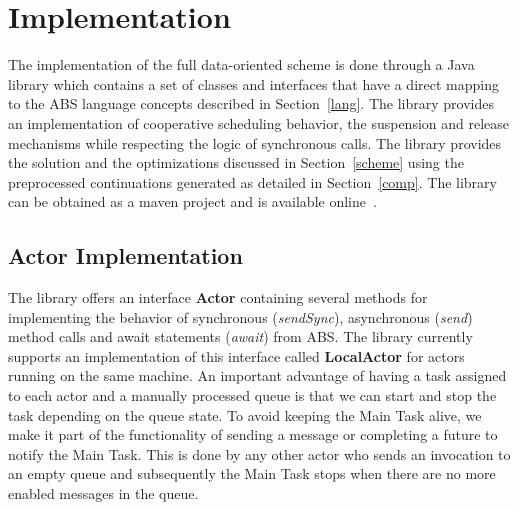 \section{Implementation}
\label{run}
The implementation of the full data-oriented scheme is done through a Java library which contains a set of classes and interfaces that have a direct mapping to the ABS language concepts described in Section~\ref{lang}. The library provides an implementation of cooperative scheduling behavior, the suspension and release mechanisms while respecting the logic of synchronous calls. The library provides the solution and the optimizations discussed in Section~\ref{scheme} using the preprocessed continuations generated as detailed in Section~\ref{comp}. The library can be obtained as a maven project and is available online~\cite{library}.





\subsection{Actor Implementation}
The library offers an interface \textbf{Actor} containing several methods for implementing the behavior of synchronous (\textit{sendSync}), asynchronous (\textit{send}) method calls and await statements (\textit{await}) from ABS. The library currently supports an implementation of this interface called \textbf{LocalActor} for actors running on the same machine. An important advantage of having a task assigned to each actor and a manually processed queue is that we can start and stop the task depending on the queue state. To avoid keeping the Main Task alive, we make it part of the functionality of sending a message or completing a future to notify the Main Task. This is done by any other actor who sends an invocation to an empty queue and subsequently the Main Task stops when there are no more enabled messages in the queue. 

